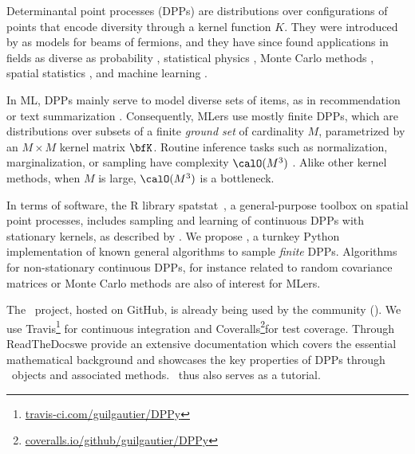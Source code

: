 \documentclass[twoside,11pt]{article}
\begin{document}
    Determinantal point processes (DPPs) are distributions over configurations of points that encode diversity through a kernel function $K$.
    They were introduced by \citet{Mac75} as models for beams of fermions, and they have since found applications in fields as diverse as probability \citep{Sos00, Kon05, HKPV06}, statistical physics \citep{PaBe11}, Monte Carlo methods \citep{BaHa16}, spatial statistics \citep{LaMoRu15}, and machine learning \citep[ML,][]{KuTa12}.

    In ML, DPPs mainly serve to model diverse sets of items, as in recommendation \citep{KaDeKo16, GaPaKo16} or text summarization \citep{DuBa18}.
    Consequently, MLers  use mostly finite DPPs, which are distributions over subsets of a finite \emph{ground set} of cardinality $M$, parametrized by an $M\times M$ kernel matrix $\bfK$.
    Routine inference tasks such as normalization, marginalization, or sampling have complexity $\calO(M^3)$ \citep{Gil14}.
    Alike other kernel methods, when $M$ is large, $\calO(M^3)$ is a bottleneck.

    In terms of software, the R library \textsf{spatstat}\ \citep{BaTu05}, a general-purpose toolbox on spatial point processes, includes sampling and learning of continuous DPPs with stationary kernels, as described by \citet{LaMoRu15}. We propose \DPPy, a turnkey Python implementation of known general algorithms to sample \emph{finite} DPPs.
    Algorithms for non-stationary continuous DPPs, for instance related to random covariance matrices or Monte Carlo methods are also of interest for MLers.

    The \DPPy\ project, hosted on GitHub,\! is already being used by the community (\citealp{BuRaWi19,Kam18,Pou19,DeCaVa19,GaBaVa19}).
    We use \setcounter{footnote}{5}Travis\!\footnote{\href{https://travis-ci.com/guilgautier/DPPy}{\textsf{travis-ci.com/guilgautier/DPPy}}} for continuous integration and Coveralls\!\footnote{\href{https://coveralls.io/github/guilgautier/DPPy}{\textsf{coveralls.io/github/guilgautier/DPPy}}}for test coverage.
    Through ReadTheDocs\hspace{1pt}we provide an extensive documentation which covers the essential mathematical background and showcases the key properties of DPPs through \DPPy\ objects and associated methods.
    \DPPy\ thus also serves as a tutorial.
\end{document}
